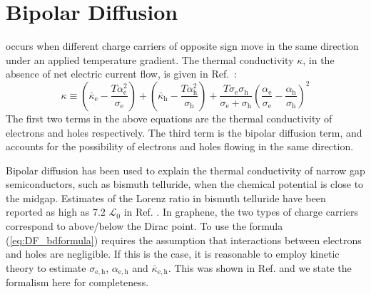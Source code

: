 \section{Bipolar Diffusion}
 occurs when different charge carriers of opposite sign move in the same direction under an applied temperature gradient. The thermal conductivity $\kappa$, in the absence of net electric current flow, is given in Ref.~\cite{nolas_thermal_2004}:
\begin{equation}
\kappa \equiv \left(\bar\kappa_{\mathrm{e}} - \frac{T\alpha_{\mathrm{e}}^2}{\sigma_{\mathrm{e}}}\right) + \left(\bar\kappa_{\mathrm{h}} - \frac{T\alpha_{\mathrm{h}}^2}{\sigma_{\mathrm{h}}}\right) + \frac{T\sigma_{\mathrm{e}}\sigma_{\mathrm{h}}}{\sigma_{\mathrm{e}}+\sigma_{\mathrm{h}}}\left(\frac{\alpha_{\mathrm{e}}}{\sigma_{\mathrm{e}}}-\frac{\alpha_{\mathrm{h}}}{\sigma_{\mathrm{h}}}\right)^2  \label{eq:DF_bdformula}
\end{equation}
The first two terms in the above equations are the thermal conductivity of electrons and holes respectively. The third term is the bipolar diffusion term, and accounts for the possibility of electrons and holes flowing in the same direction.

Bipolar diffusion has been used to explain the thermal conductivity of narrow gap semiconductors, such as bismuth telluride, when the chemical potential is close to the midgap. Estimates of the Lorenz ratio in bismuth telluride have been reported as high as 7.2 $\mathcal{L}_0$  in Ref. \cite{goldsmid_thermal_1956}.   In graphene, the two types of charge carriers correspond to above/below the Dirac point.  To use the formula (\ref{eq:DF_bdformula}) requires the assumption that interactions between electrons and holes are negligible. If this is the case, it is reasonable to employ kinetic theory to estimate $\sigma_{\mathrm{e,h}}$, $\alpha_{\mathrm{e,h}}$ and $\bar\kappa_{\mathrm{e,h}}$.  This was shown in Ref. \cite{yoshino_significant_2015} and we state the formalism here for completeness.


